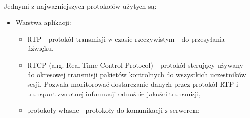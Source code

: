 \documentclass{article}
\begin{document}
	\paragraph*{} Jednymi z najważniejszych protokołów użytych są:
	\begin{itemize}
		\item Warstwa aplikacji:
		\begin{itemize}
			\item RTP - protokół transmisji w czasie rzeczywistym - do przesyłania dźwięku,
			\item RTCP (ang. Real Time Control Protocol) - protokół sterujący używany do okresowej transmisji pakietów kontrolnych do wszystkich uczestników sesji. Pozwala monitorować dostarczanie danych przez protokół RTP i transport zwrotnej informacji odnośnie jakości transmisji,
			\item protokoły własne - protokoły do komunikacji z serwerem:
		

\end{itemize}
\end{itemize}
\end{document}
